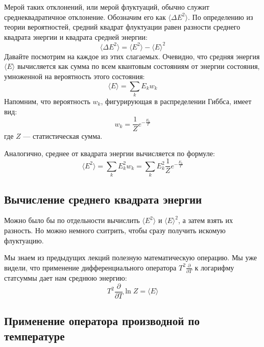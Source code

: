 \documentclass[../general/general]{subfiles}
\begin{document}
Мерой таких отклонений, или мерой флуктуаций, обычно служит среднеквадратичное отклонение. Обозначим его как $\langle \Delta E^2 \rangle$. По определению из теории вероятностей, средний квадрат флуктуации равен разности среднего квадрата энергии и квадрата средней энергии:
\begin{equation}
    \langle \Delta E^2 \rangle = \langle E^2 \rangle - \langle E \rangle^2
    \label{eq:energy_dispersion_def}
\end{equation}
Давайте посмотрим на каждое из этих слагаемых. Очевидно, что средняя энергия $\langle E \rangle$ вычисляется как сумма по всем квантовым состояниям от энергии состояния, умноженной на вероятность этого состояния:
\begin{equation*}
    \langle E \rangle = \sum_k E_k w_k
\end{equation*}
Напомним, что вероятность $w_k$, фигурирующая в распределении Гиббса, имеет вид:
\begin{equation*}
    w_k = \frac{1}{Z} e^{-\frac{E_k}{T}}
\end{equation*}
где $Z$ — статистическая сумма.

Аналогично, среднее от квадрата энергии вычисляется по формуле:
\begin{equation*}
    \langle E^2 \rangle = \sum_k E_k^2 w_k = \sum_k E_k^2 \frac{1}{Z} e^{-\frac{E_k}{T}}
\end{equation*}

\subsection{Вычисление среднего квадрата энергии}

Можно было бы по отдельности вычислить $\langle E^2 \rangle$ и $\langle E \rangle^2$, а затем взять их разность. Но можно немного схитрить, чтобы сразу получить искомую флуктуацию.

Мы знаем из предыдущих лекций полезную математическую операцию. Мы уже видели, что применение дифференциального оператора $T^2 \frac{\partial}{\partial T}$ к логарифму статсуммы дает нам среднюю энергию:
\begin{equation}
    T^2 \frac{\partial}{\partial T} \ln Z = \langle E \rangle
    \label{eq:mean_E_derivative}
\end{equation}

\subsection{Применение оператора производной по температуре}
\end{document}
